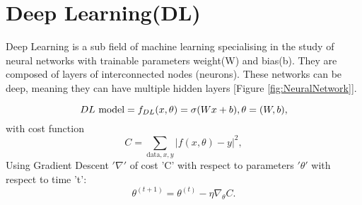 \documentclass[a4paper]{article}
\begin{document}
\section{Deep Learning(DL)}	

Deep Learning is a sub field of machine learning specialising in the study of neural networks with trainable parameters weight(W) and bias(b).  They are composed of layers of interconnected nodes (neurons). These networks can be deep, meaning they can have multiple hidden layers [Figure \ref{fig:NeuralNetwork}].
 
\[ DL \text{ model} = f_{DL}(x,\theta) = \sigma(Wx+b) , \space \theta=(W,b),\]
with cost function \[ C= \sum_{\text{data}, x, y} |f(x,\theta) - y|^2,\]
Using Gradient Descent $'\nabla'$ of cost 'C' with respect to parameters $'\theta'$ with respect to time 't':
\[\theta^{(t+1)} = \theta^{(t)} - \eta\nabla_\theta C.\] 
\end{document}
